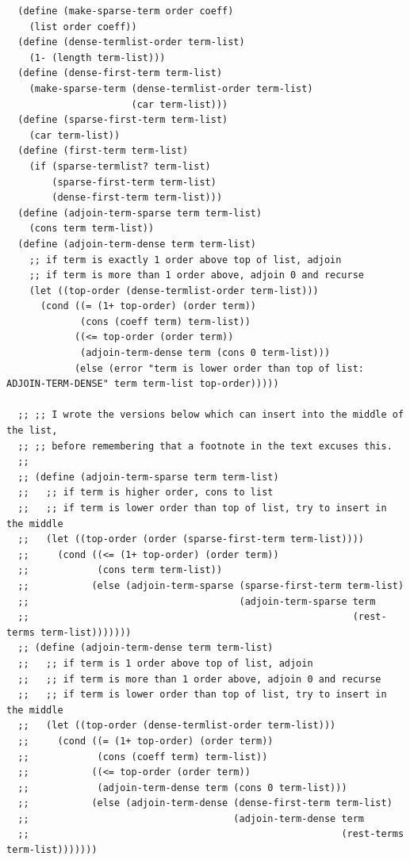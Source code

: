 \documentclass[final,fleqn,titlepage,twoside]{article}
\begin{document}
\begin{verbatim}
  (define (make-sparse-term order coeff)
    (list order coeff))
  (define (dense-termlist-order term-list)
    (1- (length term-list)))
  (define (dense-first-term term-list)
    (make-sparse-term (dense-termlist-order term-list)
                      (car term-list)))
  (define (sparse-first-term term-list)
    (car term-list))
  (define (first-term term-list)
    (if (sparse-termlist? term-list)
        (sparse-first-term term-list)
        (dense-first-term term-list)))
  (define (adjoin-term-sparse term term-list)
    (cons term term-list))
  (define (adjoin-term-dense term term-list)
    ;; if term is exactly 1 order above top of list, adjoin
    ;; if term is more than 1 order above, adjoin 0 and recurse
    (let ((top-order (dense-termlist-order term-list)))
      (cond ((= (1+ top-order) (order term))
             (cons (coeff term) term-list))
            ((<= top-order (order term))
             (adjoin-term-dense term (cons 0 term-list)))
            (else (error "term is lower order than top of list: ADJOIN-TERM-DENSE" term term-list top-order)))))

  ;; ;; I wrote the versions below which can insert into the middle of the list,
  ;; ;; before remembering that a footnote in the text excuses this.
  ;;
  ;; (define (adjoin-term-sparse term term-list)
  ;;   ;; if term is higher order, cons to list
  ;;   ;; if term is lower order than top of list, try to insert in the middle
  ;;   (let ((top-order (order (sparse-first-term term-list))))
  ;;     (cond ((<= (1+ top-order) (order term))
  ;;            (cons term term-list))
  ;;           (else (adjoin-term-sparse (sparse-first-term term-list)
  ;;                                     (adjoin-term-sparse term
  ;;                                                         (rest-terms term-list)))))))
  ;; (define (adjoin-term-dense term term-list)
  ;;   ;; if term is 1 order above top of list, adjoin
  ;;   ;; if term is more than 1 order above, adjoin 0 and recurse
  ;;   ;; if term is lower order than top of list, try to insert in the middle
  ;;   (let ((top-order (dense-termlist-order term-list)))
  ;;     (cond ((= (1+ top-order) (order term))
  ;;            (cons (coeff term) term-list))
  ;;           ((<= top-order (order term))
  ;;            (adjoin-term-dense term (cons 0 term-list)))
  ;;           (else (adjoin-term-dense (dense-first-term term-list)
  ;;                                    (adjoin-term-dense term
  ;;                                                       (rest-terms term-list)))))))


\end{verbatim}
\end{document}
